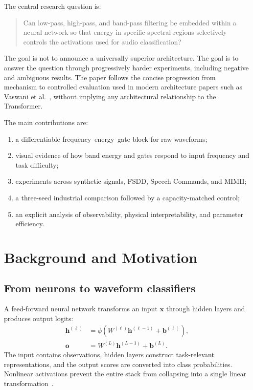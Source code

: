 \documentclass[10pt,twocolumn]{article}
\newcommand{\vect}[1]{\boldsymbol{#1}}
\begin{document}
The central research question is:

\begin{quote}
Can low-pass, high-pass, and band-pass filtering be embedded within a neural
network so that energy in specific spectral regions selectively controls the
activations used for audio classification?
\end{quote}

The goal is not to announce a universally superior architecture. The goal is
to answer the question through progressively harder experiments, including
negative and ambiguous results. The paper follows the concise progression from
mechanism to controlled evaluation used in modern architecture papers such as
Vaswani et al.~\cite{vaswani2017attention}, without implying any architectural
relationship to the Transformer.

The main contributions are:

\begin{enumerate}
  \item a differentiable frequency--energy--gate block for raw waveforms;
  \item visual evidence of how band energy and gates respond to input
        frequency and task difficulty;
  \item experiments across synthetic signals, FSDD, Speech Commands, and MIMII;
  \item a three-seed industrial comparison followed by a capacity-matched
        control;
  \item an explicit analysis of observability, physical interpretability, and
        parameter efficiency.
\end{enumerate}

\section{Background and Motivation}

\subsection{From neurons to waveform classifiers}

A feed-forward neural network transforms an input $\vect{x}$ through hidden
layers and produces output logits:
\begin{align}
  \vect{h}^{(\ell)}
  &=\phi\!\left(W^{(\ell)}\vect{h}^{(\ell-1)}+\vect{b}^{(\ell)}\right),\\
  \vect{o}&=W^{(L)}\vect{h}^{(L-1)}+\vect{b}^{(L)}.
\end{align}
The input contains observations, hidden layers construct task-relevant
representations, and the output scores are converted into class probabilities.
Nonlinear activations prevent the entire stack from collapsing into a single
linear transformation~\cite{lecun2015deep}.
\end{document}

